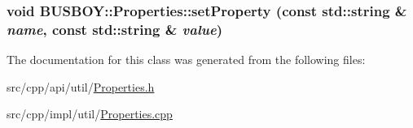 \label{classBUSBOY_1_1Properties_a073d551f053cd93ab5087cfa41e07b84}
\hypertarget{classBUSBOY_1_1Properties_ab40fa24bd8b35d291e11353f5a442868}{
\subsubsection[{setProperty}]{\setlength{\rightskip}{0pt plus 5cm}void BUSBOY::Properties::setProperty (const std::string \& {\em name}, \/  const std::string \& {\em value})}}
\label{classBUSBOY_1_1Properties_ab40fa24bd8b35d291e11353f5a442868}


The documentation for this class was generated from the following files:\begin{DoxyCompactItemize}
\item 
src/cpp/api/util/\hyperlink{Properties_8h}{Properties.h}\item 
src/cpp/impl/util/\hyperlink{Properties_8cpp}{Properties.cpp}\end{DoxyCompactItemize}

